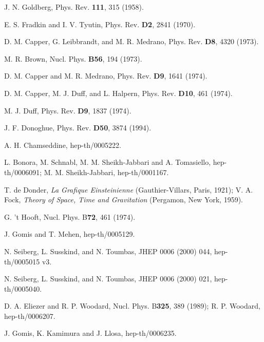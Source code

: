 \documentclass[a4paper,10pt]{article}
\begin{document}
\begin{thebibliography}{100}
 J. N. Goldberg, Phys. Rev. {\bf 111}, 315
(1958).
 
 E. S. Fradkin and I. V. Tyutin, Phys. Rev.
{\bf D2}, 2841 (1970).
 
 D. M. Capper, G. Leibbrandt, and M. R.
Medrano, Phys. Rev. {\bf D8}, 4320 (1973).

 M. R. Brown, Nucl. Phys. {\bf B56}, 194 (1973).

  D. M. Capper and M. R. Medrano, Phys. Rev.
{\bf D9}, 1641 (1974).
 
 D. M. Capper, M. J. Duff, and L. Halpern, Phys.
Rev. {\bf D10}, 461 (1974).
 
 M. J. Duff, Phys. Rev. {\bf D9}, 1837 (1974).

 J. F. Donoghue, Phys. Rev. {\bf D50}, 3874 (1994).

 A. H. Chamseddine, hep-th/0005222.

 L. Bonora, M. Schnabl, M. M. Sheikh-Jabbari and A.
Tomasiello, hep-th/0006091; M. M. Sheikh-Jabbari, hep-th/0001167.

 T. de Donder, {\it La Grafique Einsteinienne}
(Gauthier-Villars, Paris, 1921); V. A. Fock, {\it Theory of Space, Time and
Gravitation} (Pergamon, New York, 1959).

 G. 't Hooft, Nucl. Phys. B{\bf 72}, 461 (1974).

 J. Gomis and T. Mehen, hep-th/0005129.

 N. Seiberg, L. Susskind, and N. Toumbas, JHEP 0006 (2000)
044, hep-th/0005015 v3.

 N. Seiberg, L. Susskind, and N. Toumbas, JHEP 0006
(2000) 021, hep-th/0005040.

 D. A. Eliezer and R. P. Woodard, Nucl. Phys. B{\bf 325},
389 (1989); R. P. Woodard, hep-th/0006207.

 J. Gomis, K. Kamimura and J. Llosa, hep-th/0006235.


\end{thebibliography}
\end{document}

